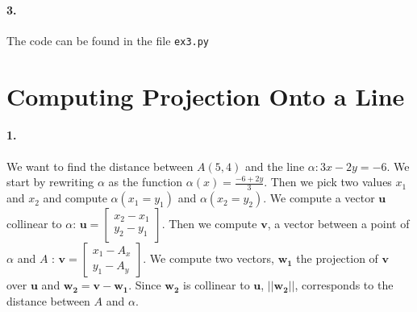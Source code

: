 \documentclass[14pt]
{article}
\begin{document}
\paragraph*{3.} The code can be found in the file \texttt{ex3.py}

\section{Computing Projection Onto a Line} %
\bigskip
\paragraph*{1.} We want to find the distance between $A(5, 4)$ and the line $\alpha : 3x - 2y = -6$. We start by rewriting $\alpha$ as the function $\alpha (x)=\frac{-6 +2y}{3}$. Then we pick two values $x_{1}$ and $x_{2}$ and compute $\alpha (x_{1}=y_{1})$ and $\alpha (x_{2}=y_{2})$. We compute a vector $\mathbf{u}$ collinear to $\alpha$: $\mathbf{u} = \begin{bmatrix} x_{2} - x_{1}\\y_{2} - y_{1} \end{bmatrix}$. Then we compute $\mathbf{v}$, a vector between a point of $\alpha$ and $A$ : $\mathbf{v} = \begin{bmatrix} x_{1} - A_{x}\\y_{1} - A_{y} \end{bmatrix}$. We compute two vectors, $\mathbf{w_{1}}$ the projection of $\mathbf{v}$ over $\mathbf{u}$ and $\mathbf{w_{2}} = \mathbf{v}-\mathbf{w_{1}}$. Since $\mathbf{w_{2}}$ is collinear to $\mathbf{u}$, $||\mathbf{w_{2}}||$, corresponds to the distance between $A$ and $\alpha$.
\end{document}
